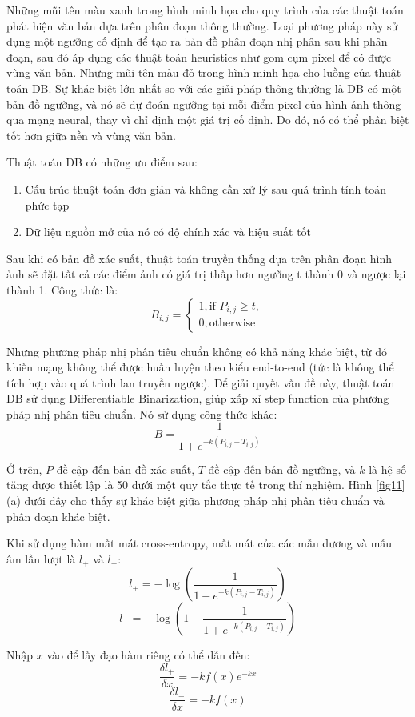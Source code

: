 Những mũi tên màu xanh trong hình minh họa cho quy trình của các thuật toán phát hiện văn bản dựa trên phân đoạn thông thường. Loại phương pháp này sử dụng một ngưỡng cố định để tạo ra bản đồ phân đoạn nhị phân sau khi phân đoạn, sau đó áp dụng các thuật toán heuristics như gom cụm pixel để có được vùng văn bản.
Những mũi tên màu đỏ trong hình minh họa cho luồng của thuật toán DB. Sự khác biệt lớn nhất so với các giải pháp thông thường là DB có một bản đồ ngưỡng, và nó sẽ dự đoán ngưỡng tại mỗi điểm pixel của hình ảnh thông qua mạng neural, thay vì chỉ định một giá trị cố định. Do đó, nó có thể phân biệt tốt hơn giữa nền và vùng văn bản.

Thuật toán DB có những ưu điểm sau:
\begin{enumerate}
    \item Cấu trúc thuật toán đơn giản và không cần xử lý sau quá trình tính toán phức tạp
    \item Dữ liệu nguồn mở của nó có độ chính xác và hiệu suất tốt
\end{enumerate}
Sau khi có bản đồ xác suất, thuật toán truyền thống dựa trên phân đoạn hình ảnh sẽ đặt tất cả các điểm ảnh có giá trị thấp hơn ngưỡng t thành 0 và ngược lại thành 1. Công thức là: 
$$
B_{i, j} = \begin{cases}
    1, \text{if } P_{i, j} \geq t, \\
    0, \text{otherwise}
\end{cases} 
$$

Nhưng phương pháp nhị phân tiêu chuẩn không có khả năng khác biệt, từ đó khiến mạng không thể được huấn luyện theo kiểu end-to-end (tức là không thể tích hợp vào quá trình lan truyền ngược). Để giải quyết vấn đề này, thuật toán DB sử dụng Differentiable Binarization, giúp xấp xỉ step function của phương pháp nhị phân tiêu chuẩn. Nó sử dụng công thức khác:
\[
    \hat{B} = \frac{1}{1+e^{-k(P_{i, j} - T_{i, j})}}    
\]

Ở trên, $P$ đề cập đến bản đồ xác suất, $T$ đề cập đến bản đồ ngưỡng, và $k$ là hệ số tăng được thiết lập là 50 dưới một quy tắc thực tế trong thí nghiệm. Hình \ref{fig11}(a) dưới đây cho thấy sự khác biệt giữa phương pháp nhị phân tiêu chuẩn và phân đoạn khác biệt.

Khi sử dụng hàm mất mát cross-entropy, mất mát của các mẫu dương và mẫu âm lần lượt là $l_+$ và $l_-$:
\[
    l_+ = -\log(\frac{1}{1+e^{-k(P_{i, j}-T_{i, j})}})
\]
\[
    l_- = -\log(1 - \frac{1}{1 + e^{-k(P_{i, j} - T_{i, j})}})
\]

Nhập $x$ vào để lấy đạo hàm riêng có thể dẫn đến:
\[
    \frac{\delta l_+}{\delta x} = -kf(x)e^{-kx}
\]
\[
    \frac{\delta l_-}{\delta x} = -kf(x)   
\]

